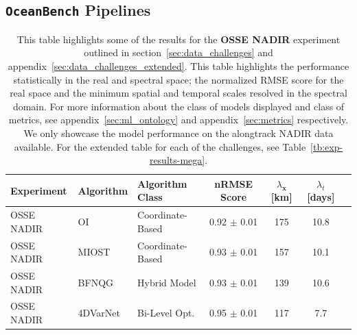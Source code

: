 \subsection*{\texttt{OceanBench} Pipelines}

\begin{table}[h]
\caption{This table highlights some of the results for the \textbf{OSSE NADIR} experiment outlined in section~\ref{sec:data_challenges} and appendix~\ref{sec:data_challenges_extended}.
This table highlights the performance statistically in the real and spectral space; the normalized RMSE score for the real space and the minimum spatial and temporal scales resolved in the spectral domain. 
For more information about the class of models displayed and class of metrics, see appendix~\ref{sec:ml_ontology} and appendix~\ref{sec:metrics} respectively. We only showcase the model performance on the alongtrack NADIR data available. For the extended table for each of the challenges, see Table~\ref{tb:exp-results-mega}.}
\label{tb:oceanbench_results}
\centering
\begin{tabular}{lllcccc}
 \toprule
Experiment &  Algorithm &   Algorithm Class &  nRMSE Score & $\lambda_{\mathbf{x}}$ [km]  & $\lambda_{t}$ [days]      \\ \midrule
\multicolumn{1}{l}{OSSE NADIR}     &  OI~\cite{DUACS} &  Coordinate-Based & 0.92 $\pm$ 0.01 & 175 & 10.8 \\
\multicolumn{1}{l}{OSSE NADIR}     &  MIOST~\cite{MIOST} &  Coordinate-Based  & 0.93 $\pm$ 0.01 & 157 & 10.1 \\
\multicolumn{1}{l}{OSSE NADIR}     &  BFNQG~\cite{BFNQG} &  Hybrid Model   & 0.93 $\pm$ 0.01 & 139 & 10.6 \\
OSSE NADIR &  4DVarNet~\cite{4DVARNETSWOT} &  Bi-Level Opt.  & 0.95 $\pm$ 0.01 & 117 & 7.7 \\
\bottomrule
\end{tabular}
\end{table}



